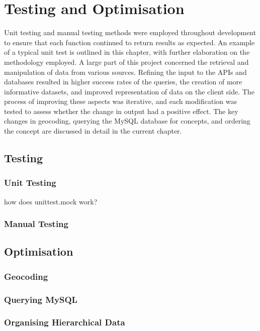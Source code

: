 \documentclass[Report.tex]{subfiles}
\begin{document}
\chapter{Testing and Optimisation}
Unit testing and manual testing methods were employed throughout development to ensure that each function continued to return results as expected. An example of a typical unit test is outlined in this chapter, with further elaboration on the methodology employed. A large part of this project concerned the retrieval and manipulation of data from various sources. Refining the input to the APIs and databases resulted in higher success rates of the queries, the creation of more informative datasets, and improved representation of data on the client side. The process of improving these aspects was iterative, and each modification was tested to assess whether the change in output had a positive effect. The key changes in geocoding, querying the MySQL database for concepts, and ordering the concept are discussed in detail in the current chapter.
\section{Testing}
\subsection{Unit Testing}
how does unittest.mock work?
\subsection{Manual Testing}
\section{Optimisation}
\subsection{Geocoding}
\subsection{Querying MySQL}
\subsection{Organising Hierarchical Data}
\end{document}
